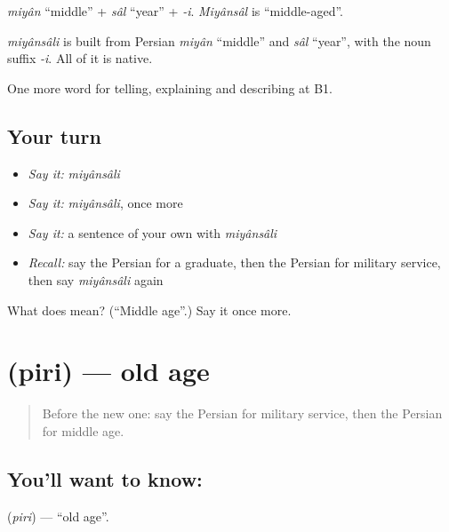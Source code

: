 \emph{miyân} \textquotedblleft{}middle\textquotedblright{} + \emph{sâl} \textquotedblleft{}year\textquotedblright{} + \emph{-i}. \emph{Miyânsâl} is \textquotedblleft{}middle-aged\textquotedblright{}.

\begin{cousinweb}
\emph{miyânsâli} is built from Persian \emph{miyân} \textquotedblleft{}middle\textquotedblright{} and \emph{sâl} \textquotedblleft{}year\textquotedblright{}, with the noun suffix \emph{-i}. All of it is native.
\end{cousinweb}

\begin{grammarlens}[title={What you've built}]
One more word for telling, explaining and describing at B1.
\end{grammarlens}

\subsection*{Your turn}
\begin{itemize}
\raggedright
  \item \emph{Say it:} \emph{miyânsâli}
  \item \emph{Say it:} \emph{miyânsâli}, once more
  \item \emph{Say it:} a sentence of your own with \emph{miyânsâli}
  \item \emph{Recall:} say the Persian for a graduate, then the Persian for military service, then say \emph{miyânsâli} again
\end{itemize}

\begin{tcolorbox}[breakable,colback=teal!4,colframe=teal!35!black,title={Before you move on}]
What does  mean? (\textquotedblleft{}Middle age\textquotedblright{}.) Say it once more.
\end{tcolorbox}
\section[\texorpdfstring{\fa{پیری} (piri)}{پیری (piri)}]{ (piri) — old age}

\label{lesson:FA-C333-piri}



\begin{quote}
Before the new one: say the Persian for military service, then the Persian for middle age.
\end{quote}

\subsection*{You'll want to know: }
\textbf{} (\emph{piri}) — \textquotedblleft{}old age\textquotedblright{}.

